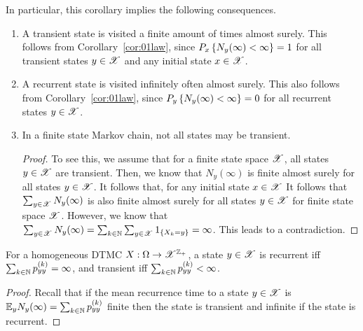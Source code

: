 \documentclass[letterpaper,10pt,english]{article}
\begin{document}
\begin{shaded}
\begin{rem}
In particular, this corollary implies the following consequences. 
\begin{enumerate}[i\_]
	\item A transient state is visited a finite amount of times almost surely. 
	This follows from Corollary~\ref{cor:01law}, since $P_x\left\{N_y(\infty) < \infty\right\} = 1$ for all transient states $y \in \mathscr{X}$ and any initial state $x \in \mathscr{X}$. 
	\item A recurrent state is visited infinitely often almost surely. 
	This also follows from Corollary~\ref{cor:01law}, since $P_y\left\{N_y(\infty) < \infty\right\} = 0$ for all recurrent states $y \in \mathscr{X}$.  
	\item In a finite state Markov chain, not all states may be transient. 
	\begin{proof}
	To see this, we assume that for a finite state space $\mathscr{X}$, all states $y \in \mathscr{X}$ are transient. 
	Then, we know that $N_y(\infty)$ is finite almost surely for all states $y \in \mathscr{X}$. 
	It follows that, for any initial state $x \in \mathscr{X}$
It follows that $\sum_{y \in \mathscr{X}}N_y(\infty)$ is also finite almost surely for all states $y \in \mathscr{X}$ for finite state space $\mathscr{X}$. 
However, we know that $\sum_{y \in \mathscr{X}}N_y(\infty) = \sum_{k \in \mathbb{N}}\sum_{y \in \mathscr{X}}1_{\left\{X_k = y\right\}} = \infty$. 
This leads to a contradiction. 
\end{proof}
\end{enumerate} 
\end{rem}
\end{shaded}
\begin{prop}
For a homogeneous DTMC $X: \Omega \to \mathscr{X}^{\mathbb{Z}_+}$, a state $y\in\mathscr{X}$ is recurrent iff
$\sum_{k\in\mathbb{N}} p_{yy}^{(k)} = \infty$, and transient iff $\sum_{k\in\mathbb{N}} p_{yy}^{(k)} < \infty$.
\end{prop}
\begin{proof}
Recall that if the mean recurrence time to a state $y\in\mathscr{X}$ is $\mathbb{E}_yN_y(\infty) = \sum_{k\in\mathbb{N}}p_{yy}^{(k)}$ finite then the state is transient and infinite if the state is recurrent.
\end{proof}
\end{document}
